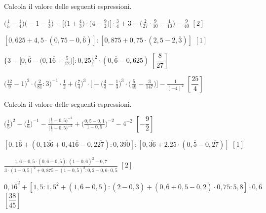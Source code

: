 \begin{esercizio}[\Ast]
\label{ese:3.155}
 Calcola il valore delle seguenti espressioni.
\begin{enumeratea}
\spazielenx
\item \(\displaystyle{\bigg(\frac{1}{5}-\frac{1}{4}\bigg)\bigg(-1-
\frac{1}{3}\bigg)+\bigg[\bigg(1+\frac{4}{3}\bigg)\cdot
\bigg(4-\frac{9}{2}\bigg)\bigg]\cdot{\frac{3}{4}}+3-\bigg(\frac{2}{27}
\cdot{\frac{9}{10}}-\frac{1}{10}\bigg)-\frac{9}{40}}\)
  \hfill \(\left[2 \right]\)
\item \(\displaystyle{\left[0,625+4,5\cdot(0,75-0,\overline{6})\right]:
\left[0,875+0,75\cdot(2,5-2,\overline{3})\right]}\)
  \hfill \(\left[1 \right]\)
\item \(\displaystyle{\bigg\{3-\bigg[0,\overline{6}-\bigg(0,1\overline{6}+
\frac{5}{12}\bigg)\bigg]:0,25\bigg\}^{2}\cdot
(0,\overline{6}-0,625)}\)
  \hfill \(\left[\dfrac{8}{27} \right]\)
\item \(\displaystyle{\bigg(\frac{12}{9}-1\bigg)^{2}\cdot\bigg(\frac{2}{81}:3
\bigg)^{-1}\cdot\frac{1}{2}+\bigg(\frac{7}{4}\bigg)^{3}\cdot
\bigg[-\bigg(\frac{4}{3}-\frac{1}{3}\bigg)^{3}\cdot\bigg(\frac{5}{49}-
\frac{3}{147}\bigg)\bigg]-\frac{1}{(-4)^{2}}}\)
  \hfill \(\left[\dfrac{25}{4} \right]\)
\end{enumeratea}
\end{esercizio}

\begin{esercizio}[\Ast]
\label{ese:3.156}
 Calcola il valore delle seguenti espressioni.
\begin{enumeratea}
\spazielenx
\item \(\displaystyle{\bigg(\frac{1}{5}\bigg)^{2}-\bigg(\frac{1}{6}
\bigg)^{-1}-\frac{\bigg(\frac{1}{3}+0,5\bigg)^{-2}}%
{\bigg(\frac{1}{3}-0,5\bigg)^{-2}}+\bigg(\frac{0,5-0,1}{1-0,5}
\bigg)^{-2}-4^{-2}}\)
  \hfill \(\left[-\dfrac{9}{2} \right]\)
\item \(\displaystyle{\left[0,1\overline{6}+(0,1\overline{36}+0,41
\overline{6}-0,2\overline{27}):0,3\overline{90}\right]:%
\left[0,\overline{36}+2.25\cdot(0,\overline{5}-0,\overline{27})\right]}\)
  \hfill \(\left[1 \right]\)
\item \(\displaystyle{\frac{1,6-0,5\cdot(0,\overline{6}-0,5):(1-0,
\overline{6})^{2}-0,7}%
{3\cdot(1-0,5)^{2}+0,875-(1-0,5)^{2}:0,2-0,6\cdot0,5}}\)
  \hfill \(\left[2 \right]\)
\item \(\displaystyle{{0,1\overline{6}}^{2}+\left[1,5:1,5^{2}+\left(1,
\overline{6}-0,5\right):\left(2-0,\overline{3}\right)%
+\left(0,\overline{6}+0,5-0,2\right)\cdot0,75:5,8\right]\cdot 0,
\overline{6}}\)
  \hfill \(\left[\dfrac{38}{45} \right]\)
\end{enumeratea}
\end{esercizio}

